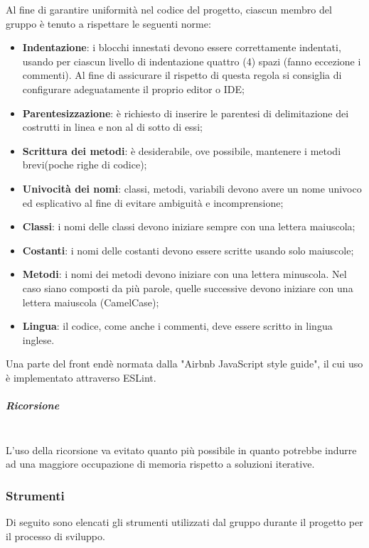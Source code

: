 Al fine di garantire uniformità nel codice del progetto, ciascun membro del 
gruppo è tenuto a rispettare le seguenti norme:
	\begin{itemize}
		\item \textbf{Indentazione}: i blocchi innestati devono essere correttamente 
			indentati, usando per ciascun livello di indentazione quattro (4) spazi (fanno 
			eccezione i commenti). Al fine di assicurare il rispetto di questa regola si 
			consiglia di configurare adeguatamente il proprio editor o IDE;
		\item \textbf{Parentesizzazione}: è richiesto di inserire le parentesi di 
			delimitazione dei costrutti in linea e non al di sotto di essi;
		\item \textbf{Scrittura dei metodi}: è desiderabile, ove possibile, 
			mantenere i metodi brevi(poche righe di codice);
		\item \textbf{Univocità dei nomi}: classi, metodi, variabili devono avere un 
			nome univoco	ed esplicativo al fine di evitare ambiguità e incomprensione;
		\item \textbf{Classi}: i nomi delle classi devono iniziare sempre con una 
			lettera maiuscola;		
		\item \textbf{Costanti}: i nomi delle costanti devono essere scritte usando 
			solo maiuscole;
		\item \textbf{Metodi}: i nomi dei metodi devono iniziare con una lettera 
			minuscola. Nel caso siano composti da più parole, quelle successive devono iniziare con una 
			lettera maiuscola (CamelCase\glo{});
		\item \textbf{Lingua}: il codice, come anche i commenti, deve essere scritto 
			in lingua inglese.
	\end{itemize}
Una parte del front end\glosp è normata dalla "Airbnb JavaScript style 
guide", il cui uso è implementato attraverso ESLint\glo. \newline \newline
\subparagraph{Ricorsione}  \mbox{}\\

L'uso della ricorsione va evitato quanto più possibile in  quanto potrebbe
indurre ad una maggiore occupazione di memoria rispetto a soluzioni iterative.
	
\subsubsection{Strumenti}
Di seguito sono elencati gli strumenti utilizzati dal gruppo durante il 
progetto per il processo di sviluppo.
		
